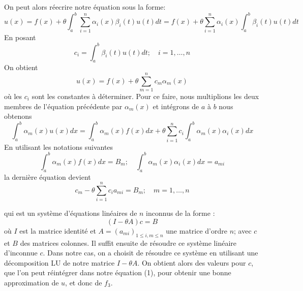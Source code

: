 \documentclass{article}
\begin{document}
On peut alors réecrire notre équation sous la forme:
\[ u(x) = f(x) + \theta \int_{a}^{b} \sum_{i=1}^{n} \alpha_i(x) \beta_i(t) u(t) dt = f(x) + \theta \sum_{i=1}^{n} \alpha_i(x) \int_{a}^{b} \beta_i(t)u(t) dt \]
En posant
\[ c_i = \int_{a}^{b} \beta_i(t)u(t) dt; \quad i = 1, \ldots, n \]
On obtient
\[
\begin{equation}
    u(x) = f(x) + \theta \sum_{m=1}^{n} c_m \alpha_m(x)
\end{equation}
\]
où les \(c_i\) sont les constantes à déterminer. Pour ce faire, nous multiplions les deux membres de l'équation précédente par \(\alpha_m(x)\) et intégrons de \(a\) à \(b\) nous obtenons
\[ \int_{a}^{b} \alpha_m(x)u(x)dx = \int_{a}^{b} \alpha_m(x)f(x)dx + \theta \sum_{i=1}^{n} c_i \int_{a}^{b} \alpha_m(x) \alpha_i(x)dx \]
En utilisant les notations suivantes
\[ \int_{a}^{b} \alpha_m(x)f(x)dx = B_m; \quad \int_{a}^{b} \alpha_m(x) \alpha_i(x)dx = a_{mi} \]
la dernière équation devient
\[ c_m - \theta \sum_{i=1}^{n} c_i a_{mi} = B_m; \quad m = 1, \ldots, n \]

qui est un système d'équations linéaires de \(n\) inconnus de la forme :
\[ (I - \theta A) c = B \]
où \(I\) est la matrice identité et \(A = (a_{mi})_{1 \leq i,m \leq n}\) une matrice d'ordre \(n\); avec \(c\) et \(B\) des matrices colonnes.
Il suffit ensuite de résoudre ce système linéaire d'inconnue $c$. Dans notre cas, on a choisit de résoudre ce système en utilisant une décomposition LU de notre matrice $I - \theta A$. On obtient alors des valeurs pour $c$, que l'on peut réintégrer dans notre équation (1), pour obtenir une bonne approximation de $u$, et donc de $f_3$.
\end{document}
